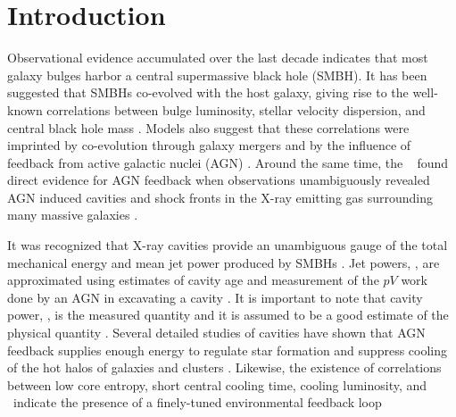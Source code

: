 \documentclass{emulateapj}
\begin{document}


\section{Introduction}
\label{sec:intro}

Observational evidence accumulated over the last decade indicates that
most galaxy bulges harbor a central supermassive black hole (SMBH).
It has been suggested that SMBHs co-evolved with the host galaxy,
giving rise to the well-known correlations between bulge luminosity,
stellar velocity dispersion, and central black hole mass
\citep{1995ARA&A..33..581K, magorrian, 2000ApJ...539L...9F,
  2000ApJ...539L..13G, marconihunt03, 2005MNRAS.362...25B}. Models
also suggest that these correlations were imprinted by co-evolution
through galaxy mergers and by the influence of feedback from active
galactic nuclei (AGN) \citep[\eg][]{1998A&A...331L...1S,
  2000MNRAS.311..576K}. Around the same time, the
\cxo\ \citep{chandra} found direct evidence for AGN feedback when
observations unambiguously revealed AGN induced cavities and shock
fronts in the X-ray emitting gas surrounding many massive galaxies
\citep[\eg][]{2000ApJ...534L.135M, perseus1, schindler01}.

It was recognized that X-ray cavities provide an unambiguous gauge of
the total mechanical energy and mean jet power produced by SMBHs
\citep{2000ApJ...534L.135M}. Jet powers, \pjet, are approximated using
estimates of cavity age and measurement of the $pV$ work done by an
AGN in excavating a cavity \citep[see][for a reviews]{cfreview,
  mcnamrev}. It is important to note that cavity power, \pcav, is the
measured quantity and it is assumed to be a good estimate of the
physical quantity \pjet. Several detailed studies of cavities have
shown that AGN feedback supplies enough energy to regulate star
formation and suppress cooling of the hot halos of galaxies and
clusters \citep{birzan04, 2005MNRAS.364.1343D, rafferty06, dunn08,
  birzan08, 2008ApJ...680..897D}. Likewise, the existence of
correlations between low core entropy, short central cooling time,
cooling luminosity, and \pjet\ indicate the presence of a finely-tuned
environmental feedback loop \citep[\ie][]{haradent,
    2008ApJ...687..899R, accept, 2009A&A...501..835M,
    2009MNRAS.395..764S}
\end{document}
